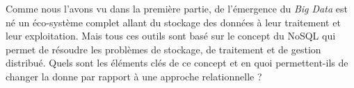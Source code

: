 Comme nous l'avons vu dans la première partie, de l'émergence du \textit{Big Data} est né un éco-système complet allant du stockage des données à leur traitement et leur exploitation. Mais tous ces outils sont basé sur le concept du NoSQL qui permet de résoudre les problèmes de stockage, de traitement et de gestion distribué. Quels sont les éléments clés de ce concept et en quoi permettent-ils de changer la donne par rapport à une approche relationnelle ? 
